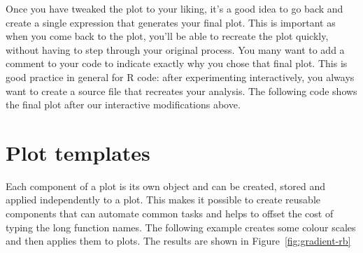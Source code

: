 % 


Once you have tweaked the plot to your liking, it's a good idea to go back and create a single expression that generates your final plot. This is important as when you come back to the plot, you'll be able to recreate the plot quickly, without having to step through your original process. You many want to add a comment to your code to indicate exactly why you chose that final plot. This is good practice in general for R code: after experimenting interactively, you always want to create a source file that recreates your analysis.  The following code shows the final plot after our interactive modifications above.

% 


\section{Plot templates}
\label{sec:templates}

Each component of a \ggplot plot is its own object and can be created, stored and applied independently to a plot. This makes it possible to create reusable components that can automate common tasks and helps to offset the cost of typing the long function names. The following example creates some colour scales and then applies them to plots. The results are shown in Figure~\ref{fig:gradient-rb}

% 



